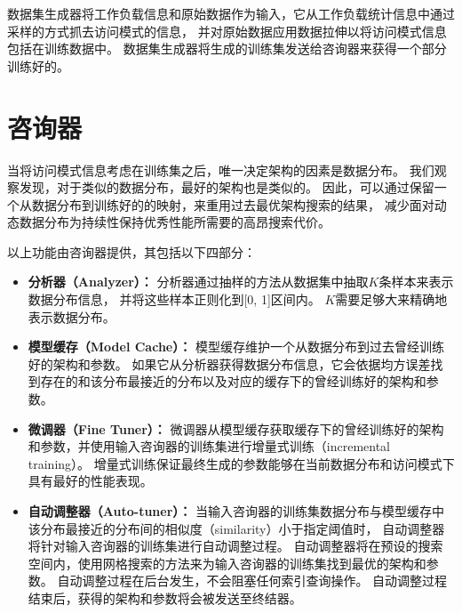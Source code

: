 数据集生成器将工作负载信息和原始数据作为输入，它从工作负载统计信息中通过采样的方式抓去访问模式的信息，
并对原始数据应用数据拉伸以将访问模式信息包括在训练数据中。
数据集生成器将生成的训练集发送给咨询器来获得一个部分训练好的{\model}。


\section{咨询器}

当将访问模式信息考虑在训练集之后，唯一决定{\li}架构的因素是数据分布。
我们观察发现，对于类似的数据分布，最好的{\li}架构也是类似的。
因此，{\sys}可以通过保留一个从数据分布到训练好的{\model}的映射，来重用过去最优{\li}架构搜索的结果，
减少面对动态数据分布为持续性保持{\li}优秀性能所需要的高昂搜索代价。


以上功能由咨询器提供，其包括以下四部分：
\begin{itemize}
  \item
    \textbf{分析器（Analyzer）：}
    分析器通过抽样的方法从数据集中抽取$K$条样本来表示数据分布信息，
    并将这些样本正则化到[0, 1]区间内。
    $K$需要足够大来精确地表示数据分布。
  \item
    \textbf{模型缓存（Model Cache）：}
    模型缓存维护一个从数据分布到过去曾经训练好的{\li}架构和参数。
    如果它从分析器获得数据分布信息，它会依据均方误差找到存在的和该分布最接近的分布以及对应的缓存下的曾经训练好的{\li}架构和参数。
  \item
    \textbf{微调器（Fine Tuner）：}
    微调器从模型缓存获取缓存下的曾经训练好的{\li}架构和参数，并使用输入咨询器的训练集进行增量式训练（incremental training）。
    增量式训练保证最终生成的{\li}参数能够在当前数据分布和访问模式下具有最好的性能表现。
  \item
    \textbf{自动调整器（Auto-tuner）：}
    当输入咨询器的训练集数据分布与模型缓存中该分布最接近的分布间的相似度（similarity）小于指定阈值时，
    自动调整器将针对输入咨询器的训练集进行自动调整过程。
    自动调整器将在预设的搜索空间内，使用网格搜索的方法来为输入咨询器的训练集找到最优的{\li}架构和参数。
    自动调整过程在后台发生，不会阻塞任何索引查询操作。
    自动调整过程结束后，获得的{\li}架构和参数将会被发送至终结器。
\end{itemize}

